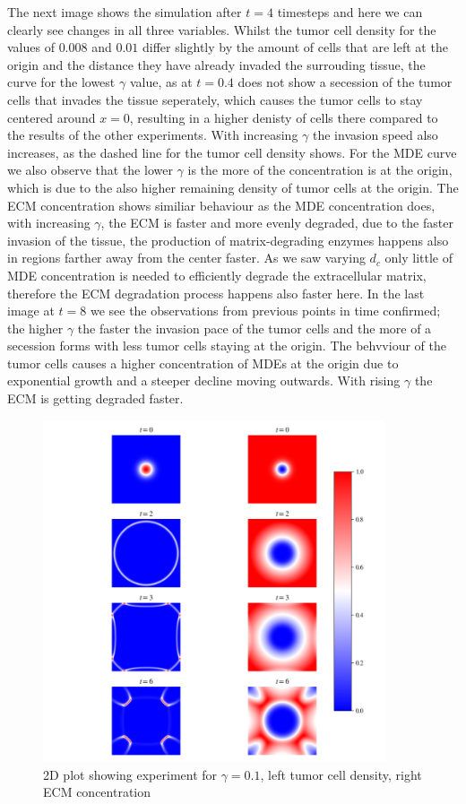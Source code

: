 The next image shows the simulation after $t=4$ timesteps and here we can clearly see changes in all three variables. 
Whilst the tumor cell density for the values of $0.008$ and $0.01$ differ slightly by the amount of cells that are left at the origin and the distance they have already invaded the surrouding tissue, the curve for the lowest $\gamma$ value, as at $t=0.4$ does not show a secession of the tumor cells that invades the tissue seperately, which causes the tumor cells to stay centered around $x=0$, resulting in a higher denisty of cells there compared to the results of the other experiments. With increasing $\gamma$ the invasion speed also increases, as the dashed line for the tumor cell density shows. For the MDE curve we also observe that the lower $\gamma$ is the more of the concentration is at the origin, which is due to the also higher remaining density of tumor cells at the origin. The ECM concentration shows similiar behaviour as the MDE concentration does, with increasing $\gamma$, the ECM is faster and more evenly degraded, due to the faster invasion of the tissue, the production of matrix-degrading enzymes happens also in regions farther away from the center faster. As we saw varying $d_c$ only little of MDE concentration is needed to efficiently degrade the extracellular matrix, therefore the ECM degradation process happens also faster here.\newline
In the last image at $t=8$ we see the observations from previous points in time confirmed; the higher $\gamma$ the faster the invasion pace of the tumor cells and the more of a secession forms with less tumor cells staying at the origin. The behvviour of the tumor cells causes a higher concentration of MDEs at the origin due to exponential growth and a steeper decline moving outwards. With rising $\gamma$ the ECM is getting degraded faster.\newline 
\begin{figure}[h]
    \centering
    \includegraphics[width=0.9\textwidth]{resources/images/gamma_2D_plot.png}
    \caption{2D plot showing experiment for $\gamma=0.1$, left tumor cell density, right ECM concentration}
    \label{fig:gamma_2D_plot}
\end{figure}
